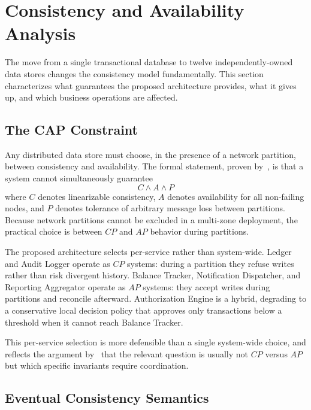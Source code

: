 \section{Consistency and Availability Analysis}

The move from a single transactional database to twelve independently-owned data stores changes the consistency model fundamentally. This section characterizes what guarantees the proposed architecture provides, what it gives up, and which business operations are affected.

\subsection{The CAP Constraint}

Any distributed data store must choose, in the presence of a network partition, between consistency and availability. The formal statement, proven by~\cite{brewer-cap-2000}, is that a system cannot simultaneously guarantee
\begin{equation}
\label{eq:consistency-availability-partition-tolerance}
C \wedge A \wedge P
\end{equation}
where $C$ denotes linearizable consistency, $A$ denotes availability for all non-failing nodes, and $P$ denotes tolerance of arbitrary message loss between partitions. Because network partitions cannot be excluded in a multi-zone deployment, the practical choice is between $CP$ and $AP$ behavior during partitions.

The proposed architecture selects per-service rather than system-wide. Ledger and Audit Logger operate as $CP$ systems: during a partition they refuse writes rather than risk divergent history. Balance Tracker, Notification Dispatcher, and Reporting Aggregator operate as $AP$ systems: they accept writes during partitions and reconcile afterward. Authorization Engine is a hybrid, degrading to a conservative local decision policy that approves only transactions below a threshold when it cannot reach Balance Tracker.

This per-service selection is more defensible than a single system-wide choice, and reflects the argument by~\cite{bailis-hat-not-cap-2014} that the relevant question is usually not $CP$ versus $AP$ but which specific invariants require coordination.

\subsection{Eventual Consistency Semantics}

